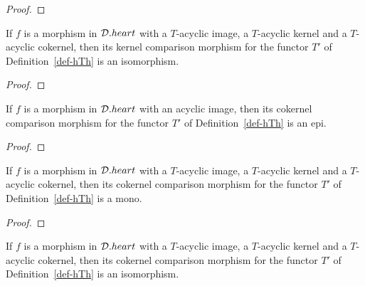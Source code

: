 \begin{proof}
\leanok
\end{proof}


\begin{lemma}
\label{prop-isIso_kernelComparison_of_acyclic_homology}
\leanok 
{}
If $f$ is a morphism in $\mathcal{D}.heart$ with a $T$-acyclic image, a $T$-acyclic kernel and a $T$-acyclic cokernel,
then its kernel comparison morphism
for the functor $T'$ of Definition~\ref{def-hTh} is an isomorphism.

\end{lemma}

\begin{proof}
\leanok
\end{proof}


\begin{lemma}
\label{prop-epi_cokernelComparison_of_acyclic_image}
\leanok 
{}
If $f$ is a morphism in $\mathcal{D}.heart$ with an acyclic image, then its cokernel comparison morphism
for the functor $T'$ of Definition~\ref{def-hTh} is an epi.

\end{lemma}

\begin{proof}
\leanok
\end{proof}


\begin{lemma}
\label{prop-mono_cokernelComparison_of_acyclic_homology}
\leanok 
{}
If $f$ is a morphism in $\mathcal{D}.heart$ with a $T$-acyclic image, a $T$-acyclic kernel and a $T$-acyclic cokernel,
then its cokernel comparison morphism
for the functor $T'$ of Definition~\ref{def-hTh} is a mono.

\end{lemma}

\begin{proof}
\leanok
\end{proof}


\begin{lemma}
\label{prop-isIso_cokernelComparison_of_acyclic_homology}
\leanok 
{}
If $f$ is a morphism in $\mathcal{D}.heart$ with a $T$-acyclic image, a $T$-acyclic kernel and a $T$-acyclic cokernel,
then its cokernel comparison morphism
for the functor $T'$ of Definition~\ref{def-hTh} is an isomorphism.

\end{lemma}

